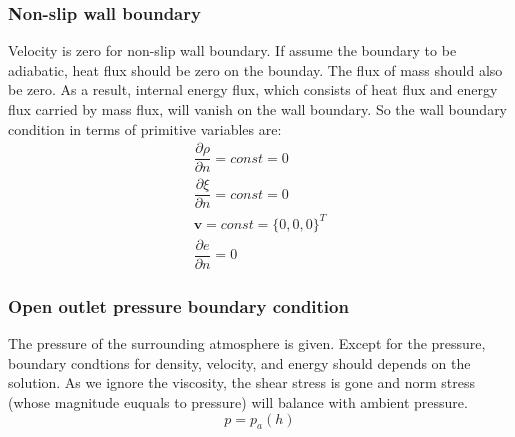 \documentclass[10pt,a4paper]{article}
\begin{document}
\subsubsection{Non-slip wall boundary}
Velocity is zero for non-slip wall boundary. If assume the boundary to be adiabatic, heat flux should be zero on the bounday. The flux of mass should also be zero. As a result, internal energy flux, which consists of heat flux and energy flux carried by mass flux, will vanish on the wall boundary. So the wall boundary condition in terms of primitive variables are:
\begin{eqnarray}
\dfrac{\partial \rho}{\partial n} = const = 0\label{eq:23} \\
\dfrac{\partial \xi}{\partial n} = const = 0 \\
\textbf{v} = const =\{0,0,0\}^T\\
\dfrac{\partial e }{\partial n} = 0\label{eq:26}
\end{eqnarray} 

\subsubsection{Open outlet pressure boundary condition}
The pressure of the surrounding atmosphere is given. Except for the pressure, boundary condtions for density, velocity, and energy should depends on the solution. As we ignore the viscosity, the shear stress is gone and norm stress (whose magnitude euquals to pressure) will balance with ambient pressure.
\begin{equation}
p = p_a(h)\label{eq:23} 
\end{equation} 
\end{document}
